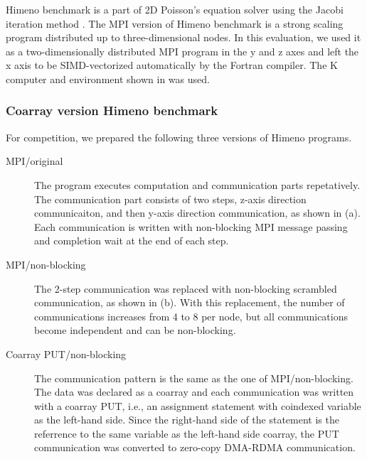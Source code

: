 Himeno benchmark is a part of 2D Poisson's equation solver using the Jacobi 
iteration method \cite{himeno}. 
The MPI version of Himeno benchmark is a strong scaling program distributed 
up to three-dimensional nodes. 
%
In this evaluation, we used it as a two-dimensionally distributed MPI program 
in the y and z axes and left the x axis to be SIMD-vectorized automatically 
by the Fortran compiler.
The K computer and environment shown in  was used.


\subsubsection{Coarray version Himeno benchmark}

For competition, we prepared the following three versions of Himeno programs.

\begin{description}
\item [MPI/original]
The program executes computation and communication parts repetatively.
The communication part consists of two steps, z-axis direction communicaiton, 
and then y-axis direction communication, as shown in  (a).
Each communication is written with non-blocking MPI message passing and
completion wait at the end of each step.

\item [MPI/non-blocking]
The 2-step communication was replaced with non-blocking scrambled communication,
as shown in  (b).
With this replacement, the number of communications increases from 4 to 8 
per node, but all communications become independent and can be non-blocking.

\item [Coarray PUT/non-blocking]
The communication pattern is the same as the one of MPI/non-blocking.
The data was declared as a coarray and each communication was written with
a coarray PUT, i.e., an assignment statement with coindexed variable as 
the left-hand side. Since the right-hand side of the statement is the referrence
to the same variable as the left-hand side coarray, the PUT communication
was converted to zero-copy DMA-RDMA communication.

\end{description}

